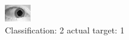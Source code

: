 \begin{figure}[h!]
\begin{center}
\includegraphics[width=0.60\columnwidth]{figures/ID1584_class_2_target_1.png}
\end{center}
\caption{ Classification: 2 actual target: 1}
\label{fig:ID1584_class_2_target_1}
\end{figure}
